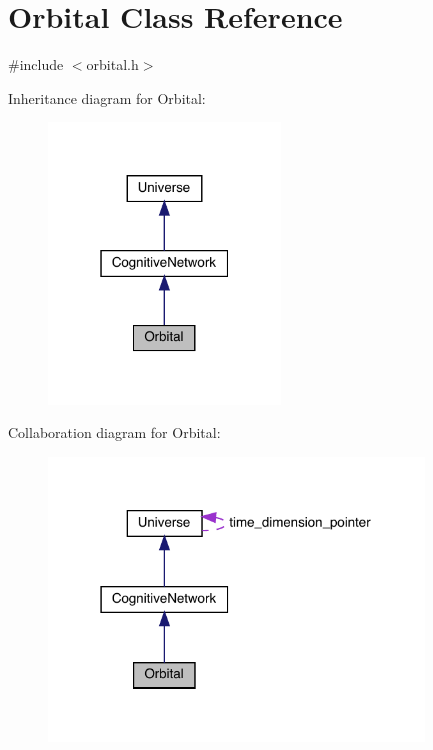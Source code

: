 \hypertarget{class_orbital}{}\section{Orbital Class Reference}
\label{class_orbital}


{\ttfamily \#include $<$orbital.\+h$>$}



Inheritance diagram for Orbital\+:\nopagebreak
\begin{figure}[H]
\begin{center}
\leavevmode
\includegraphics[width=175pt]{class_orbital__inherit__graph}
\end{center}
\end{figure}


Collaboration diagram for Orbital\+:
\nopagebreak
\begin{figure}[H]
\begin{center}
\leavevmode
\includegraphics[width=283pt]{class_orbital__coll__graph}
\end{center}
\end{figure}
